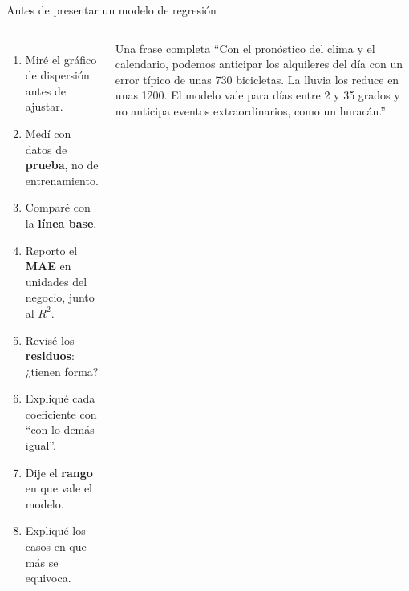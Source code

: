 \documentclass[aspectratio=169,11pt]{beamer}
\begin{document}
\begin{frame}[t]{Antes de presentar un modelo de regresión}
  \begin{columns}[T,onlytextwidth]
    \small
    \begin{enumerate}
      \small
      \item Miré el gráfico de dispersión antes de ajustar.
      \item Medí con datos de \textbf{prueba}, no de entrenamiento.
      \item Comparé con la \textbf{línea base}.
      \item Reporto el \textbf{MAE} en unidades del negocio, junto al $R^2$.
      \item Revisé los \textbf{residuos}: ¿tienen forma?
      \item Expliqué cada coeficiente con ``con lo demás igual''.
      \item Dije el \textbf{rango} en que vale el modelo.
      \item Expliqué los casos en que más se equivoca.
    \end{enumerate}
    \begin{exampleblock}{Una frase completa}
      \footnotesize ``Con el pronóstico del clima y el calendario, podemos
      anticipar los alquileres del día con un error típico de unas 730
      bicicletas. La lluvia los reduce en unas 1200. El modelo vale para
      días entre 2 y 35 grados y no anticipa eventos extraordinarios, como
      un huracán.''
    \end{exampleblock}
  \end{columns}
\end{frame}

\end{document}
